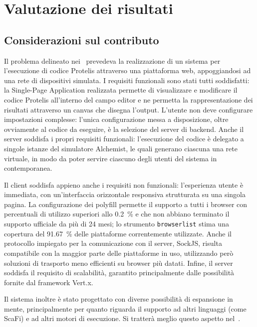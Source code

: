 \chapter{Valutazione dei risultati}\label{ch:evaluation}

  \section{Considerazioni sul contributo}
    Il problema delineato nei~ prevedeva la realizzazione di un sistema per l'esecuzione di codice Protelis attraverso una piattaforma web, appoggiandosi ad una rete di dispositivi simulata.
    I requisiti funzionali sono stati tutti soddisfatti:
    la Single-Page Application realizzata permette di visualizzare e modificare il codice Protelis all'interno del campo editor e ne permetta la rappresentazione dei risultati attraverso un canvas che disegna l'output.
    L'utente non deve configurare impostazioni complesse:
    l'unica configurazione messa a disposizione, oltre ovviamente al codice da eseguire, è la selezione del server di backend.
    Anche il server soddisfa i propri requisiti funzionali:
    l'esecuzione del codice è delegato a singole istanze del simulatore Alchemist, le quali generano ciascuna una rete virtuale, in modo da poter servire ciascuno degli utenti del sistema in contemporanea.

    Il client soddisfa appieno anche i requisiti non funzionali:
    l'esperienza utente è immediata, con un'interfaccia orizzontale responsiva strutturata su una singola pagina.
    La configurazione dei polyfill permette il supporto a tutti i browser con percentuali di utilizzo superiori allo \SI{0.2}{\percent} e che non abbiano terminato il supporto ufficiale da più di 24 mesi;
    lo strumento \texttt{browserlist} stima una copertura del \SI{91.67}{\percent} delle piattaforme correntemente utilizzate.
    Anche il protocollo impiegato per la comunicazione con il server, SockJS, risulta compatibile con la maggior parte delle piattaforme in uso, utilizzando però soluzioni di trasporto meno efficienti su browser più datati.
    Infine, il server soddisfa il requisito di scalabilità, garantito principalmente dalle possibilità fornite dal framework Vert.x.

    Il sistema inoltre è stato progettato con diverse possibilità di espansione in mente, principalmente per quanto riguarda il supporto ad altri linguaggi (come ScaFi) e ad altri motori di esecuzione.
    Si tratterà meglio questo aspetto nel~.

